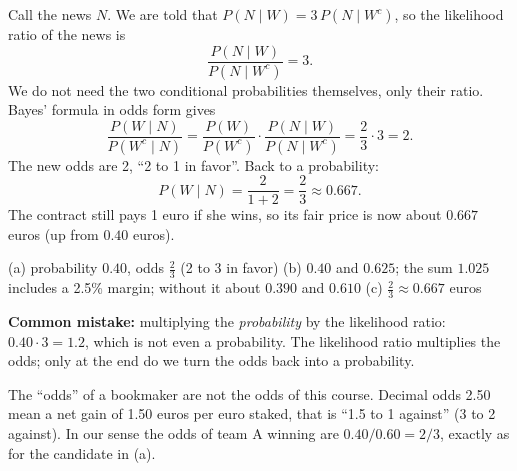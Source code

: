 \begin{solution}
	 Call the news $N$. We are told that
	$P(N\mid W)=3\,P(N\mid W^c)$, so the likelihood ratio of the news is
	\[ \frac{P(N\mid W)}{P(N\mid W^c)}=3. \]
	We do not need the two conditional probabilities themselves, only their
	ratio. Bayes' formula in odds form gives
	\[ \frac{P(W\mid N)}{P(W^c\mid N)}=\frac{P(W)}{P(W^c)}\cdot
		\frac{P(N\mid W)}{P(N\mid W^c)}=\frac23\cdot 3=2. \]
	The new odds are 2, ``2 to 1 in favor''. Back to a probability:
	\[ P(W\mid N)=\frac{2}{1+2}=\frac23\approx 0.667. \]
	The contract still pays 1 euro if she wins, so its fair price is now about
	$0.667$ euros (up from $0.40$ euros).
	\begin{answer}
		(a) probability $0.40$, odds $\frac23$ (2 to 3 in favor) \quad
		(b) $0.40$ and $0.625$; the sum $1.025$ includes a 2.5\% margin;
		without it about $0.390$ and $0.610$ \quad
		(c) $\frac23\approx 0.667$ euros
	\end{answer}
	\begin{remark}
		\textbf{Common mistake:} multiplying the \emph{probability} by the
		likelihood ratio: $0.40\cdot 3=1.2$, which is not even a probability.
		The likelihood ratio multiplies the odds; only at the end do we turn the
		odds back into a probability.
	\end{remark}
	\begin{remark}
		The ``odds'' of a bookmaker are not the odds of this course. Decimal odds
		2.50 mean a net gain of 1.50 euros per euro staked, that is ``1.5 to 1
		against'' (3 to 2 against). In our sense the odds of team A winning are
		$0.40/0.60=2/3$, exactly as for the candidate in (a).
	\end{remark}
\end{solution}
